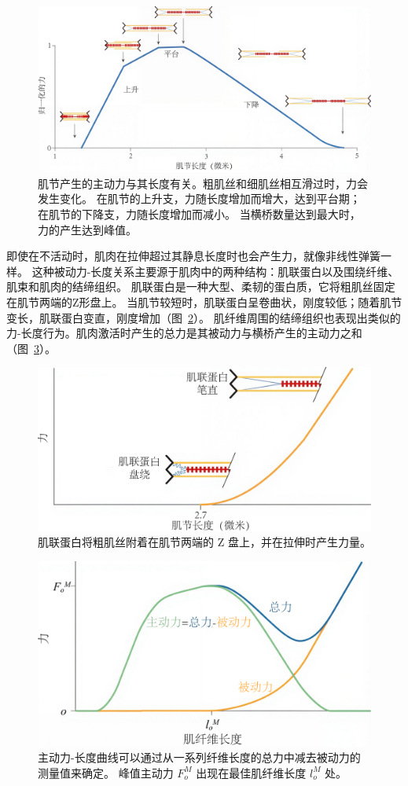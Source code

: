 \begin{figure}[!htb]
	\centering
	\includegraphics[width=0.5\linewidth]{chap4/4_6}
	\caption{肌节产生的主动力与其长度有关。粗肌丝和细肌丝相互滑过时，力会发生变化。
		在肌节的上升支，力随长度增加而增大，达到平台期；
		在肌节的下降支，力随长度增加而减小。
		当横桥数量达到最大时，力的产生达到峰值\cite{gordon1966variation}。 \label{fig:4_6}}
\end{figure}


即使在不活动时，肌肉在拉伸超过其静息长度时也会产生力，就像非线性弹簧一样。
这种被动力-长度关系主要源于肌肉中的两种结构：肌联蛋白以及围绕纤维、肌束和肌肉的结缔组织。
肌联蛋白是一种大型、柔韧的蛋白质，它将粗肌丝固定在肌节两端的Z形盘上。
当肌节较短时，肌联蛋白呈卷曲状，刚度较低；随着肌节变长，肌联蛋白变直，刚度增加（图~\ref{fig:4_7}）。
肌纤维周围的结缔组织也表现出类似的力-长度行为。肌肉激活时产生的总力是其被动力与横桥产生的主动力之和（图~\ref{fig:4_8}）。

\begin{figure}[!htb]
	\centering
	\includegraphics[width=0.7\linewidth]{chap4/4_7}
	\caption{肌联蛋白将粗肌丝附着在肌节两端的 Z 盘上，并在拉伸时产生力量。 \label{fig:4_7}}
\end{figure}

\begin{figure}[!htb]
	\centering
	\includegraphics[width=0.7\linewidth]{chap4/4_8}
	\caption{主动力-长度曲线可以通过从一系列纤维长度的总力中减去被动力的测量值来确定。
		峰值主动力 $F_o^M$ 出现在最佳肌纤维长度 $l_o^M$ 处。 \label{fig:4_8}}
\end{figure}


